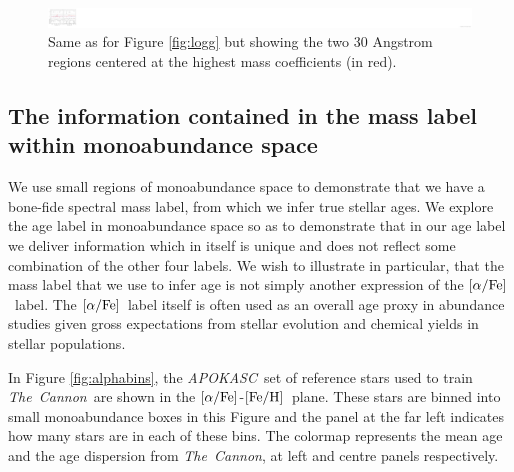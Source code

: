 \documentclass[12pt, preprint]{aastex}
\newcommand{\project}[1]{\textsl{#1}}
\newcommand{\tc}{\project{The~Cannon}}
\newcommand{\apokasc}{\project{APOKASC}}
\newcommand{\feh}{\mbox{$\rm [Fe/H]$}}
\newcommand{\alphafe}{\mbox{$\rm [\alpha/Fe]$}}
\begin{document}
\begin{figure}[h!]
\centering
    \includegraphics[scale=0.51]{./plots/coeffs_m_3.png}
  \caption{Same as for Figure \ref{fig:logg} but showing the two 30 Angstrom regions centered at the highest mass coefficients (in red).}
\label{fig:mass}
\end{figure}



\subsection{The information contained in the mass label within monoabundance space}

We use small regions of monoabundance space to demonstrate that we have a bone-fide spectral mass label, from which we infer true stellar ages. We explore the age label in monoabundance space so as to demonstrate that in our age label we deliver information which in itself is unique and does not reflect some combination of the other four labels. We wish to illustrate in particular, that the mass label that we use to infer age is not simply another expression of the \alphafe\ label. The \alphafe\ label itself is often used as an overall age proxy in abundance studies given gross expectations from stellar evolution and chemical yields in stellar populations. 

In Figure \ref{fig:alphabins}, the \apokasc\ set of reference stars used to train \tc\ are shown in the \alphafe-\feh\ plane. These stars are binned into small monoabundance boxes in this Figure and the panel at the far left indicates how many stars are in each of these bins. The colormap represents the mean age and the age dispersion from \tc, at left and centre panels respectively. 
\end{document}
